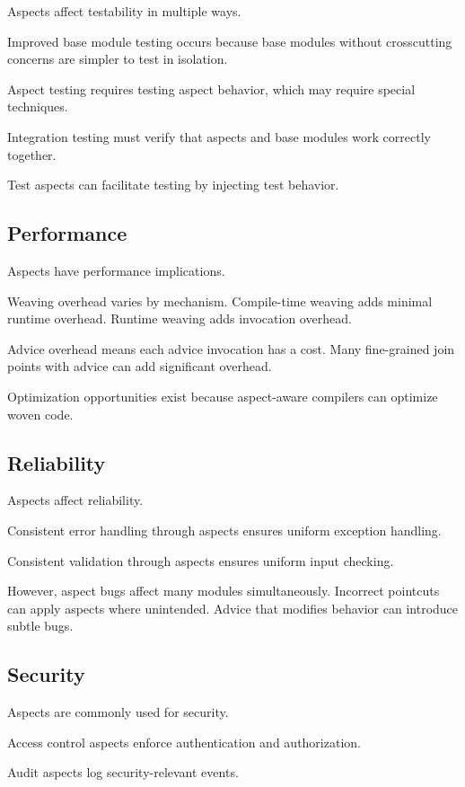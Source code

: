 \documentclass[11pt]{article}
\begin{document}
Aspects affect testability in multiple ways.

Improved base module testing occurs because base modules without crosscutting concerns are simpler to test in isolation.

Aspect testing requires testing aspect behavior, which may require special techniques.

Integration testing must verify that aspects and base modules work correctly together.

Test aspects can facilitate testing by injecting test behavior.

\subsection{Performance}

Aspects have performance implications.

Weaving overhead varies by mechanism. Compile-time weaving adds minimal runtime overhead. Runtime weaving adds invocation overhead.

Advice overhead means each advice invocation has a cost. Many fine-grained join points with advice can add significant overhead.

Optimization opportunities exist because aspect-aware compilers can optimize woven code.

\subsection{Reliability}

Aspects affect reliability.

Consistent error handling through aspects ensures uniform exception handling.

Consistent validation through aspects ensures uniform input checking.

However, aspect bugs affect many modules simultaneously. Incorrect pointcuts can apply aspects where unintended. Advice that modifies behavior can introduce subtle bugs.

\subsection{Security}

Aspects are commonly used for security.

Access control aspects enforce authentication and authorization.

Audit aspects log security-relevant events.
\end{document}
